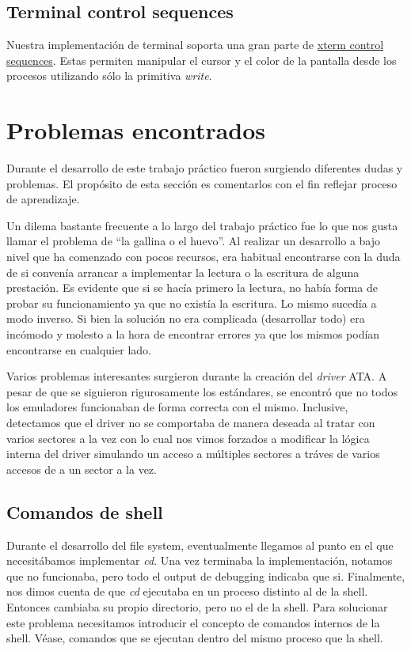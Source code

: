 \documentclass[a4paper,10pt]{article}
\begin{document}
\subsection{Terminal control sequences}
Nuestra implementación de terminal soporta una gran parte de \href{http://invisible-island.net/xterm/ctlseqs/ctlseqs.html}{xterm control sequences}.
Estas permiten manipular el cursor y el color de la pantalla desde los procesos utilizando sólo la primitiva \textit{write}.

\newpage
\section{Problemas encontrados}

Durante el desarrollo de este trabajo práctico fueron surgiendo diferentes dudas y problemas. El propósito de esta
sección es comentarlos con el fin reflejar proceso de aprendizaje.

Un dilema bastante frecuente a lo largo del trabajo práctico fue lo que nos gusta llamar el problema de ``la gallina o el huevo''. Al realizar
un desarrollo a bajo nivel que ha comenzado con pocos recursos, era habitual encontrarse con la duda de si convenía
arrancar a implementar la lectura o la escritura de alguna prestación. Es evidente que si se hacía primero la lectura, 
no había forma de probar su funcionamiento ya que no existía la escritura. Lo mismo sucedía a modo inverso. Si bien 
la solución no era complicada (desarrollar todo) era incómodo y molesto a la hora de encontrar errores ya que los mismos
podían encontrarse en cualquier lado.

Varios problemas interesantes surgieron durante la creación del \textit{driver} ATA. A pesar de que se siguieron
rigurosamente los estándares, se encontró que no todos los emuladores funcionaban de forma correcta con el mismo.
Inclusive, detectamos que el driver no se comportaba de manera deseada al tratar con varios sectores a la vez con lo
cual nos vimos forzados a modificar la lógica interna del driver simulando un acceso a múltiples sectores a tráves de
varios accesos de a un sector a la vez.


      \subsection{Comandos de shell}
      Durante el desarrollo del file system, eventualmente llegamos al punto en el que necesitábamos implementar \textit{cd}.
      Una vez terminaba la implementación, notamos que no funcionaba, pero todo el output de debugging indicaba que si.
      Finalmente, nos dimos cuenta de que \textit{cd} ejecutaba en un proceso distinto al de la shell.
      Entonces cambiaba su propio directorio, pero no el de la shell.
      Para solucionar este problema necesitamos introducir el concepto de comandos internos de la shell.
      Véase, comandos que se ejecutan dentro del mismo proceso que la shell.
\end{document}
